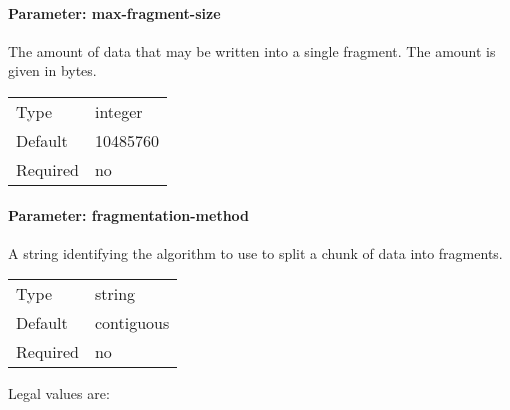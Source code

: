 \paragraph{Parameter: max-fragment-size}
The amount of data that may be written into a single fragment. 
The amount is given in bytes.

\begin{preserve}
  \noindent
  \begin{tabular}{ll}
    Type     & integer  \\ 
    Default  & 10485760 \\ 
    Required & no       \\ 
  \end{tabular}
\end{preserve}
\FloatBarrier
\vspace{\gapsize}


\paragraph{Parameter: fragmentation-method}
A string identifying the algorithm to use to split a chunk of data into fragments. 

\begin{preserve}
  \noindent
  \begin{tabular}{ll}
    Type     & string     \\ 
    Default  & contiguous \\ 
    Required & no         \\ 
  \end{tabular}
\end{preserve}

Legal values are:

